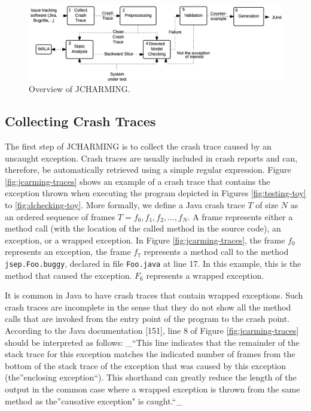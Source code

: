 \documentclass[12pt]{report}
\begin{document}
\begin{figure}
  \centering
    \includegraphics[scale=0.9]{media/chap8/jcharming-approach.png}
    \caption{Overview of JCHARMING.
    \label{fig:jcarming-approach}}
\end{figure}

\subsection{Collecting Crash Traces}\label{collecting-crash-traces}

The first step of JCHARMING is to collect the crash trace caused by an
uncaught exception. Crash traces are usually included in crash reports
and can, therefore, be automatically retrieved using a simple regular
expression. Figure \ref{fig:jcarming-traces} shows an example of a crash
trace that contains the exception thrown when executing the program
depicted in Figures \ref{fig:testing-toy} to \ref{fig:dchecking-toy}.
More formally, we define a Java crash trace \(T\) of size \(N\) as an
ordered sequence of frames \(T={f_0, f_1, f_2, ..., f_N}\). A frame
represents either a method call (with the location of the called method
in the source code), an exception, or a wrapped exception. In Figure
\ref{fig:jcarming-traces}, the frame \(f_0\) represents an exception,
the frame \(f_7\) represents a method call to the method
\texttt{jsep.Foo.buggy}, declared in file \texttt{Foo.java} at line 17.
In this example, this is the method that caused the exception. \(F_6\)
represents a wrapped exception.

It is common in Java to have crash traces that contain wrapped
exceptions. Such crash traces are incomplete in the sense that they do
not show all the method calls that are invoked from the entry point of
the program to the crash point. According to the Java documentation
{[}151{]}, line 8 of Figure \ref{fig:jcarming-traces} should be
interpreted as follows: \_``This line indicates that the remainder of
the stack trace for this exception matches the indicated number of
frames from the bottom of the stack trace of the exception that was
caused by this exception (the''enclosing exception``). This shorthand
can greatly reduce the length of the output in the common case where a
wrapped exception is thrown from the same method as the''causative
exception" is caught.``\_
\end{document}
